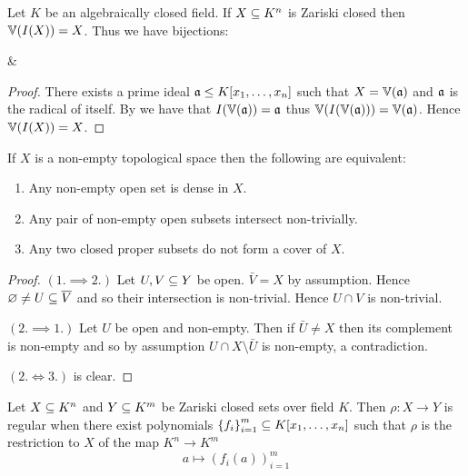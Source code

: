 \begin{cor}
    Let $K$ be an algebraically closed field.
    If $X \subseteq K^n$ is Zariski closed then $\mathbb{V}(I(X)) = X$. 
    Thus we have 
     bijections:
    \begin{cd}
        \ar[r,rightharpoonup,"I(\star)",shift left = 1]
        \ar[r,leftharpoondown,"\V(\star)",swap,shift right = 1]
        &
    \end{cd}
\end{cor}
\begin{proof}
    There exists a prime ideal $\mathfrak{a} \leq K[x_1,\dots,x_n]$ such that 
    $X = \mathbb{V}(\mathfrak{a})$ and $\mathfrak{a}$ is the radical of itself.
    By 
    we have that $I(\mathbb{V}(\mathfrak{a})) = \mathfrak{a}$ thus $\mathbb{V}(I(\mathbb{V}(\mathfrak{a}))) = \mathbb{V}(\mathfrak{a})$.
    Hence $\mathbb{V}(I(X)) = X$.
\end{proof}

\begin{prop}[Irreducible]
    If $X$ is a non-empty topological space
    then the following are equivalent:
    \begin{enumerate}
        \item Any non-empty open set is dense in $X$.
        \item Any pair of non-empty open subsets intersect non-trivially.
        \item Any two closed proper subsets do not form a cover of $X$.
    \end{enumerate}
\end{prop}
\begin{proof}
    $(1. \implies 2.)$ Let $U,V \subseteq Y$ be open.
    $\bar{V} = X$ by assumption.
    Hence $\varnothing \ne U \subseteq \overline{V}$ 
    and so their intersection is non-trivial.
    Hence $U \cap V$ is non-trivial.

    $(2. \implies 1.)$ Let $U$ be open and non-empty. 
    Then if $\bar{U} \ne X$ then its complement is non-empty and so 
    by assumption $U \cap X \setminus \bar{U}$ is non-empty,
    a contradiction.

    $(2. \iff 3.)$ is clear.
\end{proof}

\begin{dfn}
    Let $X \subseteq K^n$ and $Y \subseteq K^m$ be Zariski closed sets over field $K$.
    Then $\rho : X \to Y$ is regular when there exist polynomials 
    $\left\{f_i\right\}_{i = 1}^m \subseteq K[x_1,\dots,x_n]$ such that 
    $\rho$ is the restriction to $X$ of the map $K^n \to K^m$
    \[a \mapsto (f_i(a))_{i=1}^m\]
\end{dfn}

